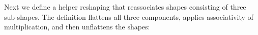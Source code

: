 Next we define a helper reshaping that reassociates shapes consisting of three
sub-shapes.  The definition flattens all three components, applies
associativity of multiplication, and then unflattens the shapes:
\begin{code}%
%
\>[2]\AgdaSpace{}%
\AgdaSymbol{:}\AgdaSpace{}%
\AgdaSpace{}%
\AgdaSymbol{((}\AgdaSpace{}%
\AgdaSpace{}%
\AgdaSymbol{)}\AgdaSpace{}%
\AgdaSpace{}%
\AgdaSymbol{)}\AgdaSpace{}%
\AgdaSymbol{(}\AgdaSpace{}%
\AgdaSpace{}%
\AgdaSymbol{(}\AgdaSpace{}%
\AgdaSpace{}%
\AgdaSymbol{))}\<%
\\
%
\>[2]\AgdaSpace{}%
\AgdaSymbol{\{}\AgdaSymbol{\}}\AgdaSpace{}%
\AgdaSymbol{\{}\AgdaSymbol{\}}\AgdaSpace{}%
\AgdaSymbol{\{}\AgdaSymbol{\}}\AgdaSpace{}%
\AgdaSymbol{=}\<%
\\
\>[2][@{}l@{\AgdaIndent{0}}]%
\>[5]\<%
\\
\>[5][@{}l@{\AgdaIndent{0}}]%
\>[7]\AgdaSymbol{(}\AgdaSpace{}%
\AgdaSpace{}%
\AgdaSymbol{)}\AgdaSpace{}%
\AgdaSpace{}%
%
\>[40]\AgdaSpace{}%
\AgdaSymbol{(}\AgdaSpace{}%
\AgdaSpace{}%
\AgdaSymbol{)}\AgdaSpace{}%
\AgdaSpace{}%
\AgdaSpace{}%
\<%
\\
%
\>[7]\AgdaSymbol{(}\AgdaSpace{}%
\AgdaSymbol{(}\AgdaSpace{}%
\AgdaSymbol{)}\AgdaSpace{}%
\AgdaSpace{}%
\AgdaSpace{}%
\AgdaSymbol{(}\AgdaSpace{}%
\AgdaSymbol{))}\AgdaSpace{}%
\AgdaSpace{}%
\AgdaSpace{}%
\AgdaSymbol{(}\AgdaSpace{}%
\AgdaSymbol{)}%
\>[40]\AgdaSpace{}%
\AgdaSpace{}%
\AgdaSpace{}%
\AgdaSymbol{(}\AgdaSpace{}%

\end{code}

